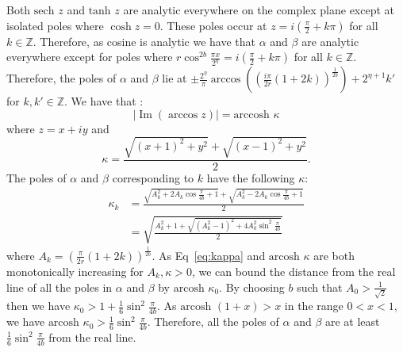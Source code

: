\documentclass[aps,floatfix,10pt,amssymb,amsfont,amsmath,superscriptaddress,float,nofootinbib,longbibliography,nobalancelastpage,twocolumn]{revtex4-2}
\begin{document}
Both $\text{sech } z$ and $\text{tanh } z$ are analytic everywhere on the complex plane except at isolated poles where $\cosh z = 0$. These poles occur at $z = i(\frac{\pi}{2} + k \pi)$ for all $k \in \mathbb{Z}$. Therefore, as cosine is analytic we have that $\alpha$ and $\beta$ are analytic everywhere except for poles where $r \cos^{2b}\frac{\pi x}{2^{\eta}} = i(\frac{\pi}{2} + k \pi)$ for all $k \in \mathbb{Z}$. Therefore, the poles of $\alpha$ and $\beta$ lie at $\pm\frac{2^{\eta}}{\pi}\arccos ((\frac{i\pi}{2r}(1+2k))^{\frac{1}{2b}}) + 2^{\eta+1} k'$ for $k, k' \in \mathbb{Z}$. We have that \cite[\href{http://dlmf.nist.gov/4.23.E35}{4.23.35}]{NIST:DLMF}:
\begin{equation}
    |\operatorname{Im}(\arccos z)| = \text{arccosh }{\kappa}
\end{equation}
where $z=x+iy$ and
\begin{equation}
    \kappa = \frac{\sqrt{(x+1)^2 + y^2} + \sqrt{(x-1)^2+y^2}}{2}.
\end{equation}
The poles of $\alpha$ and $\beta$ corresponding to $k$ have the following $\kappa$:
\begin{align}
    \kappa_k &= \frac{\sqrt{A_k^2 + 2A_k\cos \frac{\pi}{4b}+1} +\sqrt{A_k^2 - 2A_k\cos \frac{\pi}{4b}+1}}{2}\\
    &= \sqrt{\frac{A_k^2+1 + \sqrt{(A_k^2-1)^2+4A_k^2\sin^2\frac{\pi}{4b}}}{2}}
    \label{eq:kappa}
\end{align}
where $A_k = (\frac{\pi}{2r}(1+2k))^{\frac{1}{2b}}$.  As Eq~\eqref{eq:kappa} and $\text{arcosh } \kappa$ are both monotonically increasing for $A_k, \kappa>0$, we can bound the distance from the real line of all the poles in $\alpha$ and $\beta$ by $\text{arcosh } \kappa_0$. By choosing $b$ such that $A_0 > \frac{1}{\sqrt{2}}$ then we have $\kappa_0 > 1 + \frac{1}{6}\sin^2\frac{\pi}{4b}$. As $\text{arcosh } (1+x) > x$ in the range $0<x<1$, we have $\text{arcosh } \kappa_0 > \frac{1}{6}\sin^2\frac{\pi}{4b}$. Therefore, all the poles of $\alpha$ and $\beta$ are at least $\frac{1}{6}\sin^2\frac{\pi}{4b}$ from the real line.
\end{document}

